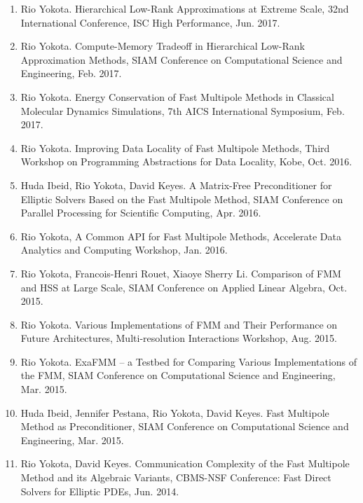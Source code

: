 \documentclass[margin,line]{cv}
\begin{document}
\begin{resume}
\begin{enumerate}
\item Rio Yokota. Hierarchical Low-Rank Approximations at Extreme Scale, 32nd International Conference, ISC High Performance, Jun. 2017.

\item Rio Yokota. Compute-Memory Tradeoff in Hierarchical Low-Rank Approximation Methods, SIAM Conference on Computational Science and Engineering, Feb. 2017.

\item Rio Yokota. Energy Conservation of Fast Multipole Methods in Classical Molecular Dynamics Simulations, 7th AICS International Symposium, Feb. 2017.

\item Rio Yokota. Improving Data Locality of Fast Multipole Methods, Third Workshop on Programming Abstractions for Data Locality, Kobe, Oct. 2016.

\item Huda Ibeid, Rio Yokota, David Keyes. A Matrix-Free Preconditioner for Elliptic Solvers Based on the Fast Multipole Method, SIAM Conference on Parallel Processing for Scientific Computing, Apr. 2016.

\item Rio Yokota, A Common API for Fast Multipole Methods, Accelerate Data Analytics and Computing Workshop, Jan. 2016.

\item Rio Yokota, Francois-Henri Rouet, Xiaoye Sherry Li. Comparison of FMM and HSS at Large Scale, SIAM Conference on Applied Linear Algebra, Oct. 2015.

\item Rio Yokota. Various Implementations of FMM and Their Performance on Future Architectures, Multi-resolution Interactions Workshop, Aug. 2015.

\item Rio Yokota. ExaFMM -- a Testbed for Comparing Various Implementations of the FMM, SIAM Conference on Computational Science and Engineering, Mar. 2015.

\item Huda Ibeid, Jennifer Pestana, Rio Yokota, David Keyes. Fast Multipole Method as Preconditioner, SIAM Conference on Computational Science and Engineering, Mar. 2015.

\item Rio Yokota, David Keyes. Communication Complexity of the Fast Multipole Method and its Algebraic Variants, CBMS-NSF Conference: Fast Direct Solvers for Elliptic PDEs, Jun. 2014.


\end{enumerate}
\end{resume}
\end{document}
